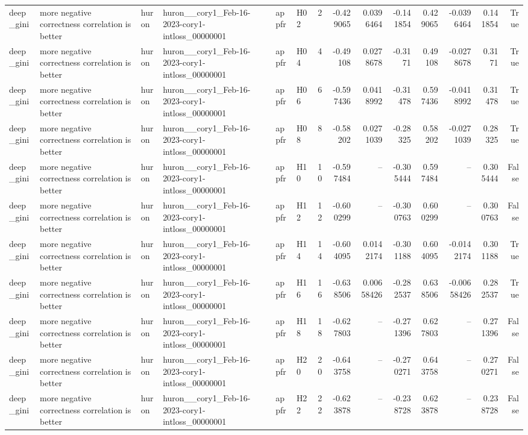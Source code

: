 \begin{longtable}{llllllrrrrrrrr}
deep\_gini & more negative correctness correlation is better & huron & huron\_\_cory1\_Feb-16-2023-cory1-intloss\_00000001 & appfr & H02 & 2 & -0.429065 & 0.0396464 & -0.141854 & 0.429065 & -0.0396464 & 0.141854 & True \\
deep\_gini & more negative correctness correlation is better & huron & huron\_\_cory1\_Feb-16-2023-cory1-intloss\_00000001 & appfr & H04 & 4 & -0.49108 & 0.0278678 & -0.3171 & 0.49108 & -0.0278678 & 0.3171 & True \\
deep\_gini & more negative correctness correlation is better & huron & huron\_\_cory1\_Feb-16-2023-cory1-intloss\_00000001 & appfr & H06 & 6 & -0.597436 & 0.0418992 & -0.31478 & 0.597436 & -0.0418992 & 0.31478 & True \\
deep\_gini & more negative correctness correlation is better & huron & huron\_\_cory1\_Feb-16-2023-cory1-intloss\_00000001 & appfr & H08 & 8 & -0.58202 & 0.0271039 & -0.28325 & 0.58202 & -0.0271039 & 0.28325 & True \\
deep\_gini & more negative correctness correlation is better & huron & huron\_\_cory1\_Feb-16-2023-cory1-intloss\_00000001 & appfr & H10 & 10 & -0.597484 & -- & -0.305444 & 0.597484 & -- & 0.305444 & False \\
deep\_gini & more negative correctness correlation is better & huron & huron\_\_cory1\_Feb-16-2023-cory1-intloss\_00000001 & appfr & H12 & 12 & -0.600299 & -- & -0.300763 & 0.600299 & -- & 0.300763 & False \\
deep\_gini & more negative correctness correlation is better & huron & huron\_\_cory1\_Feb-16-2023-cory1-intloss\_00000001 & appfr & H14 & 14 & -0.604095 & 0.0142174 & -0.301188 & 0.604095 & -0.0142174 & 0.301188 & True \\
deep\_gini & more negative correctness correlation is better & huron & huron\_\_cory1\_Feb-16-2023-cory1-intloss\_00000001 & appfr & H16 & 16 & -0.638506 & 0.00658426 & -0.282537 & 0.638506 & -0.00658426 & 0.282537 & True \\
deep\_gini & more negative correctness correlation is better & huron & huron\_\_cory1\_Feb-16-2023-cory1-intloss\_00000001 & appfr & H18 & 18 & -0.627803 & -- & -0.271396 & 0.627803 & -- & 0.271396 & False \\
deep\_gini & more negative correctness correlation is better & huron & huron\_\_cory1\_Feb-16-2023-cory1-intloss\_00000001 & appfr & H20 & 20 & -0.643758 & -- & -0.270271 & 0.643758 & -- & 0.270271 & False \\
deep\_gini & more negative correctness correlation is better & huron & huron\_\_cory1\_Feb-16-2023-cory1-intloss\_00000001 & appfr & H22 & 22 & -0.623878 & -- & -0.238728 & 0.623878 & -- & 0.238728 & False \\

\end{longtable}
